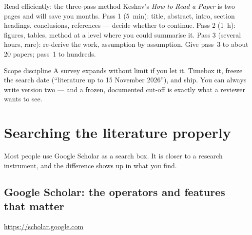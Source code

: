 \documentclass[11pt,a4paper]{article}
\begin{document}
\begin{cbox}{Read efficiently: the three-pass method}
Keshav's \emph{How to Read a Paper} is two pages and will save you months.
Pass 1 (5~min): title, abstract, intro, section headings, conclusions,
references --- decide whether to continue. Pass 2 (1~h): figures, tables,
method at a level where you could summarise it. Pass 3 (several hours, rare):
re-derive the work, assumption by assumption. Give pass~3 to about 20 papers;
pass~1 to hundreds.
\end{cbox}

\begin{wbox}{Scope discipline}
A survey expands without limit if you let it. Timebox it, freeze the search
date (``literature up to 15 November 2026''), and ship. You can always write
version two --- and a frozen, documented cut-off is exactly what a reviewer
wants to see.
\end{wbox}

\section{Searching the literature properly}
\label{sec:scholar}

Most people use Google Scholar as a search box. It is closer to a research
instrument, and the difference shows up in what you find.

\subsection{Google Scholar: the operators and features that matter}

\url{https://scholar.google.com}
\end{document}

